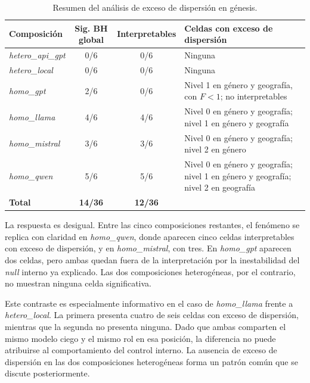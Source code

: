 \begin{table}[htbp]
	\centering
	\caption{Resumen del análisis de exceso de dispersión en génesis.}
	\label{tab:dispersion_resumen}
	\small
	\begin{tabular}{p{3.0cm} c c p{6.0cm}}
		\hline
		\textbf{Composición} &
		\textbf{Sig. BH global} &
		\textbf{Interpretables} &
		\textbf{Celdas con exceso de dispersión} \\
		\hline
		
		\textit{hetero\_api\_gpt}
		& 0/6 & 0/6 & Ninguna \\
		
		\textit{hetero\_local}
		& 0/6 & 0/6 & Ninguna \\
		
		\textit{homo\_gpt}
		& 2/6 & 0/6 & Nivel 1 en género y geografía, con $F<1$; no interpretables \\
		
		\textit{homo\_llama}
		& 4/6 & 4/6 & Nivel 0 en género y geografía; nivel 1 en género y geografía \\
		
		\textit{homo\_mistral}
		& 3/6 & 3/6 & Nivel 0 en género y geografía; nivel 2 en género \\
		
		\textit{homo\_qwen}
		& 5/6 & 5/6 & Nivel 0 en género y geografía; nivel 1 en género y geografía; nivel 2 en geografía \\
		
		\hline
		\textbf{Total}
		& \textbf{14/36} & \textbf{12/36} & \\
		\hline
	\end{tabular}
\end{table}

La respuesta es desigual. Entre las cinco composiciones restantes, el fenómeno se replica con claridad en \textit{homo\_qwen}, donde aparecen cinco celdas interpretables con exceso de dispersión, y en \textit{homo\_mistral}, con tres. En \textit{homo\_gpt} aparecen dos celdas, pero ambas quedan fuera de la interpretación por la inestabilidad del \textit{null} interno ya explicado. Las dos composiciones heterogéneas, por el contrario, no muestran ninguna celda significativa.

Este contraste es especialmente informativo en el caso de \textit{homo\_llama} frente a \textit{hetero\_local}. La primera presenta cuatro de seis celdas con exceso de dispersión, mientras que la segunda no presenta ninguna. Dado que ambas comparten el mismo modelo ciego y el mismo rol
en esa posición, la diferencia no puede atribuirse al comportamiento del control interno. La ausencia de exceso de dispersión en las dos composiciones heterogéneas forma un patrón común que se discute posteriormente.

